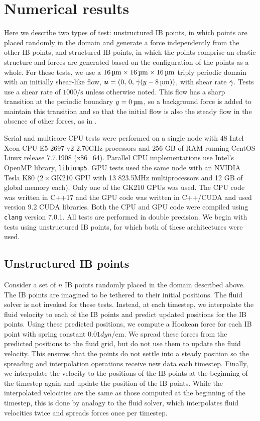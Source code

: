 \section{Numerical results} \label{sec:results}

Here we describe two types of test: unstructured IB points, in which points are placed
randomly in the domain and generate a force independently from the other IB points, and
structured IB points, in which the points comprise an elastic structure and forces are
generated based on the configuration of the points as a whole. For these tests, we use
a $16\um\times16\um\times16\um$ triply periodic domain with an initially shear-like flow,
$\u=(0,\,0,\,\shear(y-8\um))$, with shear rate $\dot{\gamma}$. Tests use a shear rate of
$1000\si{\per\second}$ unless otherwise noted. This flow has a sharp transition at the
periodic boundary $y=0\um$, so a background force is added to maintain this transition
and so that the initial flow is also the steady flow in the absence of other forces, as
in \cite{Fai:2013do}.

Serial and multicore CPU tests were performed on a single node with 48 Intel{\reg}
Xeon{\reg} CPU E5-2697 v2 2.70\si{\giga\hertz} processors and 256 GB of RAM running
CentOS Linux release 7.7.1908 (x86\_64). Parallel CPU implementations use Intel's OpenMP
library, \texttt{libiomp5}. GPU tests used the same node with an NVIDIA{\reg} Tesla{\reg}
K80 ($2\times$GK210 GPU with 13 823.5\si{\mega\hertz} multiprocessors and 12 GB of global
memory each). Only one of the GK210 GPUs was used. The CPU code was written in C++17 and
the GPU code was written in C++/CUDA and used version 9.2 CUDA libraries. Both the CPU
and GPU code were compiled using \texttt{clang} version 7.0.1. All tests are performed in
double precision. We begin with tests using unstructured IB points, for which both of
these architectures were used.

\subsection{Unstructured IB points}\label{sec:unst}

Consider a set of $n$ IB points randomly placed in the domain described above. The IB
points are imagined to be tethered to their initial positions. The fluid solver is not
invoked for these tests. Instead, at each timestep, we interpolate the fluid velocity to
each of the IB points and predict updated positions for the IB points. Using these
predicted positions, we compute a Hookean force for each IB point with spring constant
$0.01\si{dyn\per\centi\meter}$. We spread these forces from the predicted positions to
the fluid grid, but do not use them to update the fluid velocity. This ensures that the
points do not settle into a steady position so the spreading and interpolation operations
receive new data each timestep. Finally, we interpolate the velocity to the positions of
the IB points at the beginning of the timestep again and update the position of the IB
points. While the interpolated velocities are the same as those computed at the beginning
of the timestep, this is done by analogy to the fluid solver, which interpolates fluid
velocities twice and spreads forces once per timestep.

